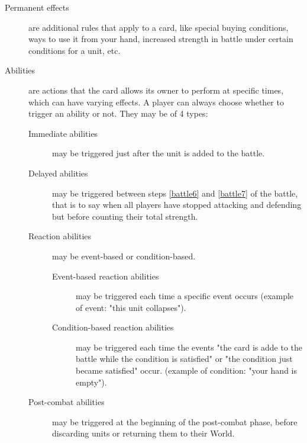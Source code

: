 \documentclass[a4paper]{article}
\begin{document}
    \begin{description}
        \item[Permanent effects] are additional rules that apply to a card,
            like special buying conditions, ways to use it from your hand, 
            increased strength in battle under certain conditions for a unit, etc.
        \item[Abilities] are actions that the card allows its owner
            to perform at specific times, which can have varying effects.
            A player can always choose whether to trigger an ability or not.
            They may be of 4 types:
            
            \begin{description}
        	        \item[Immediate abilities]
                       may be triggered just after the unit is added to the battle.
        	        \item[Delayed abilities]
                       may be triggered between steps \ref{battle6} and \ref{battle7}
                       of the battle, that is to say when all players have stopped
                       attacking and defending but before counting their total strength.
        	        \item[Reaction abilities] may be event-based or condition-based.
	                    \begin{description}
                            \item[Event-based reaction abilities]
                                may be triggered each time a specific event occurs
                                (example of event: "this unit collapses").
                            \item[Condition-based reaction abilities]
                                may be triggered each time the events
                                "the card is adde to the battle while the condition is satisfied" or
                                "the condition just became satisfied" occur.
                                (example of condition: "your hand is empty").
                        \end{description}
        	        \item[Post-combat abilities]
        	            may be triggered at the beginning of the post-combat phase,
        	            before discarding units or returning them to their World.
            \end{description}
    \end{description}
    
\end{document}
